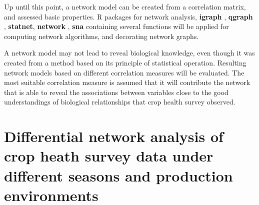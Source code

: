 Up until this point, a network model can be created from a correlation matrix, and assessed basic properties. R packages for network analysis, \textbf{igraph} , \textbf{qgraph} , \textbf{statnet}, \textbf{network} , \textbf{sna} containing several functions will be applied for computing  network algorithms, and decorating network graphs.


A network model may not lead to reveal biological knowledge, even though it was created from a method based on its principle of statistical operation. Resulting network models based on different correlation measures will be evaluated. The most suitable correlation measure is assumed that it will contribute the network that is able to reveal the associations between variables close to the good understandings of biological relationships that crop health survey observed.  

\section*{Differential network analysis of crop heath survey data under different seasons and production environments}



